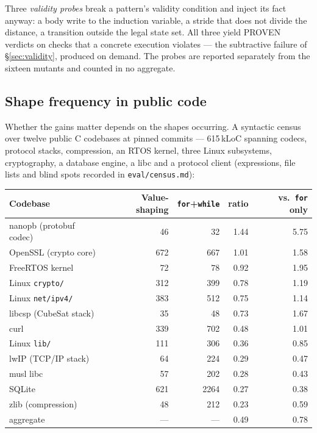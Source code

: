 \documentclass[11pt,a4paper]{article}
\begin{document}
Three \emph{validity probes} break a pattern's validity condition and inject its fact
anyway: a body write to the induction variable, a stride that does not divide the
distance, a transition outside the legal state set. All three yield PROVEN verdicts on
checks that a concrete execution violates --- the subtractive failure of
\S\ref{sec:validity}, produced on demand. The probes are reported separately from the
sixteen mutants and counted in no aggregate.

\subsection{Shape frequency in public code}
\label{sec:census}

Whether the gains matter depends on the shapes occurring. A syntactic census over twelve
public C codebases at pinned commits --- 615\,kLoC spanning codecs, protocol stacks,
compression, an RTOS kernel, three Linux subsystems, cryptography, a database engine, a
libc and a protocol client (expressions, file lists and blind spots recorded in
\texttt{eval/census.md}):

\begin{center}
\begin{tabular}{lrrrr}
\toprule
Codebase & Value-shaping & \texttt{for}+\texttt{while} & ratio & vs.\ \texttt{for} only \\
\midrule
nanopb (protobuf codec) & 46 & 32 & 1.44 & 5.75 \\
OpenSSL (crypto core) & 672 & 667 & 1.01 & 1.58 \\
FreeRTOS kernel & 72 & 78 & 0.92 & 1.95 \\
Linux \texttt{crypto/} & 312 & 399 & 0.78 & 1.19 \\
Linux \texttt{net/ipv4/} & 383 & 512 & 0.75 & 1.14 \\
libcsp (CubeSat stack) & 35 & 48 & 0.73 & 1.67 \\
curl & 339 & 702 & 0.48 & 1.01 \\
Linux \texttt{lib/} & 111 & 306 & 0.36 & 0.85 \\
lwIP (TCP/IP stack) & 64 & 224 & 0.29 & 0.47 \\
musl libc & 57 & 202 & 0.28 & 0.43 \\
SQLite & 621 & 2264 & 0.27 & 0.38 \\
zlib (compression) & 48 & 212 & 0.23 & 0.59 \\
\midrule
aggregate & --- & --- & 0.49 & 0.78 \\
\bottomrule
\end{tabular}
\end{center}
\end{document}
